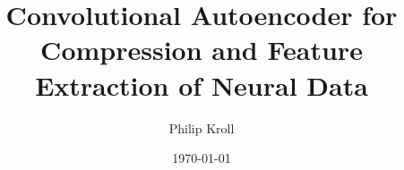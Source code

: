 \documentclass[notitlepage]{article}
\begin{document}
\title{Convolutional Autoencoder for Compression and Feature Extraction of Neural Data}
\author{Philip Kroll}
\date{\today}

\maketitle














\appendix

\end{document}
